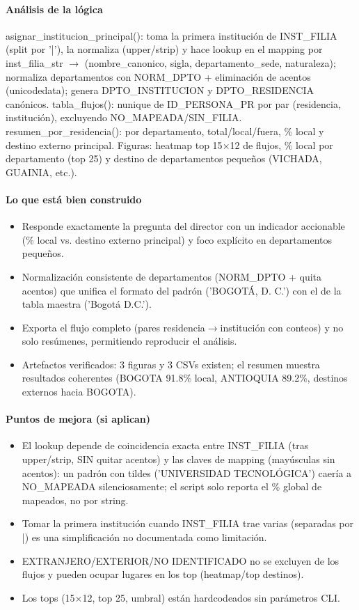 \paragraph{Análisis de la lógica}
asignar\_institucion\_principal(): toma la primera institución de INST\_FILIA (split por '|'), la normaliza (upper/strip) y hace lookup en el mapping por inst\_filia\_str $\rightarrow$ (nombre\_canonico, sigla, departamento\_sede, naturaleza); normaliza departamentos con NORM\_DPTO + eliminación de acentos (unicodedata); genera DPTO\_INSTITUCION y DPTO\_RESIDENCIA canónicos. tabla\_flujos(): nunique de ID\_PERSONA\_PR por par (residencia, institución), excluyendo NO\_MAPEADA/SIN\_FILIA. resumen\_por\_residencia(): por departamento, total/local/fuera, \% local y destino externo principal. Figuras: heatmap top 15$\times$12 de flujos, \% local por departamento (top 25) y destino de departamentos pequeños (VICHADA, GUAINIA, etc.).

\paragraph{Lo que está bien construido}
\begin{itemize}
  \item Responde exactamente la pregunta del director con un indicador accionable (\% local vs. destino externo principal) y foco explícito en departamentos pequeños.
  \item Normalización consistente de departamentos (NORM\_DPTO + quita acentos) que unifica el formato del padrón ('BOGOTÁ, D. C.') con el de la tabla maestra ('Bogotá D.C.').
  \item Exporta el flujo completo (pares residencia$\rightarrow$institución con conteos) y no solo resúmenes, permitiendo reproducir el análisis.
  \item Artefactos verificados: 3 figuras y 3 CSVs existen; el resumen muestra resultados coherentes (BOGOTA 91.8\% local, ANTIOQUIA 89.2\%, destinos externos hacia BOGOTA).
\end{itemize}

\paragraph{Puntos de mejora (si aplican)}
\begin{itemize}
  \item El lookup depende de coincidencia exacta entre INST\_FILIA (tras upper/strip, SIN quitar acentos) y las claves de mapping (mayúsculas sin acentos): un padrón con tildes ('UNIVERSIDAD TECNOLÓGICA') caería a NO\_MAPEADA silenciosamente; el script solo reporta el \% global de mapeados, no por string.
  \item Tomar la primera institución cuando INST\_FILIA trae varias (separadas por |) es una simplificación no documentada como limitación.
  \item EXTRANJERO/EXTERIOR/NO IDENTIFICADO no se excluyen de los flujos y pueden ocupar lugares en los top (heatmap/top destinos).
  \item Los tops (15$\times$12, top 25, umbral) están hardcodeados sin parámetros CLI.
\end{itemize}

